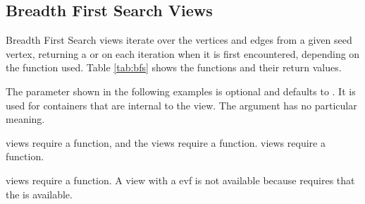 \subsection{Breadth First Search Views}

Breadth First Search views iterate over the vertices and edges from a given seed vertex, returning a  
or  on each iteration when it is first encountered, depending on the function used. 
Table \ref{tab:bfs} shows the functions and their return values.

The  parameter shown in the following examples is optional and defaults to . It is used for containers 
that are internal to the view. The  argument has no particular meaning.

 views require a  function, and the  views require a  function.
 views require a  function.

 views require a  function. 
A  view with a evf is not available because  requires that the  is available.



